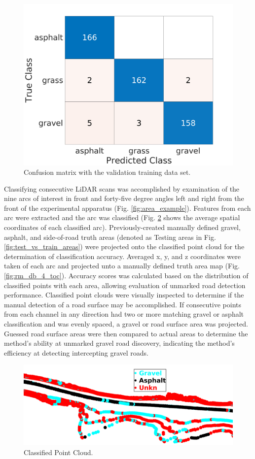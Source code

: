 \documentclass[journal,onecolumn]{IEEEtran}
\begin{document}
			\begin{figure}[H]
				\centering
				\includegraphics[width=0.55\linewidth]{figures/chan_2c_conf_VALIDATION_mat222}
				\caption[Validation Error]{Confusion matrix with the validation training data set.}
				\label{fig:vali_err_conf_mat}
			\end{figure}			
			
			{Classifying consecutive LiDAR scans was accomplished by examination of the nine arcs of interest in front and forty-five degree angles left and right from the front of the experimental apparatus (Fig. \ref{fig:area_example}). Features from each arc were extracted and the arc was classified (Fig. \ref{fig:raw_classification_results} shows the average spatial coordinates of each classified arc). Previously-created manually defined gravel, asphalt, and side-of-road truth areas (denoted as Testing areas in Fig. \ref{fig:test_vs_train_areas}) were projected onto the classified point cloud for the determination of classification accuracy. Averaged x, y, and z coordinates were taken of each arc and projected unto a manually defined truth area map (Fig. \ref{fig:rm_db_4_toc}). Accuracy scores was calculated based on the distribution of classified points with each area, allowing evaluation of unmarked road detection performance. Classified point clouds were visually inspected to determine if the manual detection of a road surface may be accomplished. If consecutive points from each channel in any direction had two or more matching gravel or asphalt classification and was evenly spaced, a gravel or road surface area was projected. Guessed road surface areas were then compared to actual areas to determine the method's ability at unmarked gravel road discovery, indicating the method's efficiency at detecting intercepting gravel roads. }
			
			\begin{figure}[H]
				\centering
				\includegraphics[width=0.9\linewidth]{figures/classified_point_cloud_example_redux}
				\caption[Classified Point Cloud]{Classified Point Cloud.}
				\label{fig:raw_classification_results}
			\end{figure}
		
\end{document}
